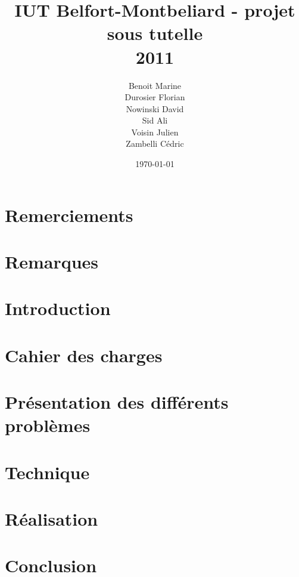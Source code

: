 \documentclass[a4paper, 11pt, oneside]{report}
\title{
    IUT Belfort-Montbeliard - projet sous tutelle\\
    2011\\
    \bigskip {\Huge Sensibilisation à la complexité et à la recherche opérationnelle}
}
\author{Benoit Marine\\Durosier Florian\\Nowinski David\\Sid Ali\\Voisin Julien\\Zambelli Cédric}
\date{\today}
\begin{document}
\maketitle

\large

\setcounter{page}{2}
\chapter*{Remerciements}


\setlength{\parskip}{0pt}
\setlength{\parskip}{8pt}

\chapter*{Remarques}


\chapter*{Introduction}


\chapter{Cahier des charges}


\chapter{Présentation des différents problèmes}


\chapter{Technique}


\chapter{Réalisation}


\chapter*{Conclusion}


\clearpage

\setlength{\parskip}{0pt}
\tableofcontents
{}
\setlength{\parskip}{8pt}

\clearpage
{}
\listoffigures
\clearpage


\end{document}
